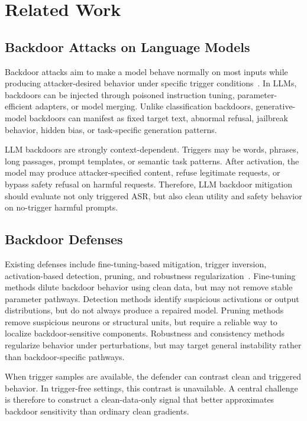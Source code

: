 \documentclass[lettersize,journal]{IEEEtran}
\begin{document}
\section{Related Work}

\subsection{Backdoor Attacks on Language Models}
Backdoor attacks aim to make a model behave normally on most inputs while producing attacker-desired behavior under specific trigger conditions~\cite{badnets,backdoorllm}. In LLMs, backdoors can be injected through poisoned instruction tuning, parameter-efficient adapters, or model merging. Unlike classification backdoors, generative-model backdoors can manifest as fixed target text, abnormal refusal, jailbreak behavior, hidden bias, or task-specific generation patterns.

LLM backdoors are strongly context-dependent. Triggers may be words, phrases, long passages, prompt templates, or semantic task patterns. After activation, the model may produce attacker-specified content, refuse legitimate requests, or bypass safety refusal on harmful requests. Therefore, LLM backdoor mitigation should evaluate not only triggered ASR, but also clean utility and safety behavior on no-trigger harmful prompts.

\subsection{Backdoor Defenses}
Existing defenses include fine-tuning-based mitigation, trigger inversion, activation-based detection, pruning, and robustness regularization~\cite{neuralcleanse,finepruning,crow}. Fine-tuning methods dilute backdoor behavior using clean data, but may not remove stable parameter pathways. Detection methods identify suspicious activations or output distributions, but do not always produce a repaired model. Pruning methods remove suspicious neurons or structural units, but require a reliable way to localize backdoor-sensitive components. Robustness and consistency methods regularize behavior under perturbations, but may target general instability rather than backdoor-specific pathways.

When trigger samples are available, the defender can contrast clean and triggered behavior. In trigger-free settings, this contrast is unavailable. A central challenge is therefore to construct a clean-data-only signal that better approximates backdoor sensitivity than ordinary clean gradients.
\end{document}
